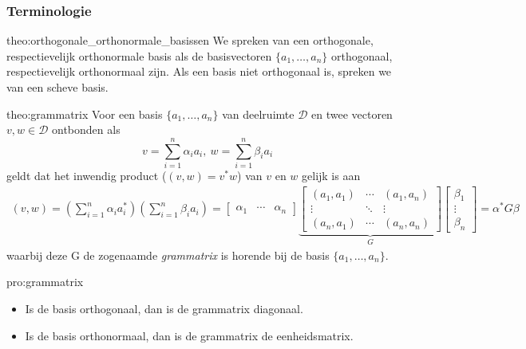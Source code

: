 \subsubsection{Terminologie}

\vspace{0.5cm}

\begin{theo}{theo:orthogonale_orthonormale_basissen}
    We spreken van een orthogonale, respectievelijk orthonormale basis als de basisvectoren $\{a_1, \ldots, a_n\}$ orthogonaal, respectievelijk orthonormaal zijn. Als een basis niet orthogonaal is, spreken we van een scheve basis.
\end{theo}

\begin{theo}[Grammatrix]{theo:grammatrix}
    Voor een basis $\{a_1, \ldots, a_n\}$ van deelruimte $\mathcal{D}$ en twee vectoren $v, w \in \mathcal{D}$ ontbonden als
    \begin{equation*}
            v = \sum_{i=1}^{n} \alpha_i a_i, \
            w = \sum_{i=1}^{n} \beta_i a_i
    \end{equation*}
    geldt dat het inwendig product ($( v, w ) = v^*w$) van $v$ en $w$ gelijk is aan
    \begin{align*}
        ( v, w ) 
            = \left( \sum_{i=1}^{n} \alpha_i a_i^* \right)\left( \sum_{i=1}^{n} \beta_i a_i \right) 
            = 
                \begin{bmatrix} \alpha_1 & \cdots & \alpha_n \end{bmatrix} 
                \underbrace{\begin{bmatrix} ( a_1, a_1 ) & \cdots & ( a_1, a_n ) \\ \vdots & \ddots & \vdots \\ ( a_n, a_1 ) & \cdots & ( a_n, a_n ) \end{bmatrix}}_{G} 
                \begin{bmatrix} \beta_1 \\ \vdots \\ \beta_n \end{bmatrix}
            = \alpha^* G \beta
    \end{align*}
    waarbij deze G de zogenaamde \emph{grammatrix} is horende bij de basis $\{a_1, \ldots, a_n\}$.
\end{theo}

\begin{pro}[Grammatrix]{pro:grammatrix}
    \begin{itemize}
        \item Is de basis orthogonaal, dan is de grammatrix diagonaal.
        \item Is de basis orthonormaal, dan is de grammatrix de eenheidsmatrix.
    \end{itemize}
\end{pro}

